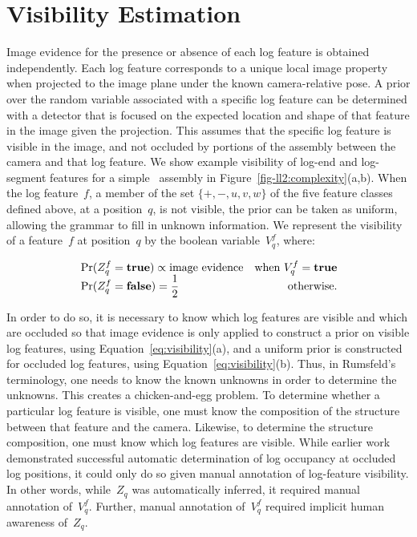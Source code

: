 \par\vspace{-1ex}
\section{Visibility Estimation}
\label{sec-ll2:visibility}

Image evidence for the presence or absence of each log feature is obtained
independently.
%
Each log feature corresponds to a unique local image property when projected to
the image plane under the known camera-relative pose.
%
A prior over the random variable associated with a specific log feature can be
determined with a detector that is focused on the expected location and shape
of that feature in the image given the projection.
%
This assumes that the specific log feature is visible in the image, and not
occluded by portions of the assembly between the camera and that log feature.
%
We show example visibility of log-end and log-segment features for a simple
\LincolnLog\ assembly in Figure~\ref{fig-ll2:complexity}(a,b).
%
When the log feature~$f$, a member of the set $\{+,-,u,v,w\}$ of the five
feature classes defined above, at a position~$q$, is not visible, the prior can
be taken as uniform, allowing the grammar to fill in unknown information.
%
We represent the visibility of a feature~$f$ at position~$q$ by the boolean
variable~$V^f_q$, where:

\par\vspace*{-4ex}
\begin{subequations}
  \begin{align}
    &\Pr(Z^f_q=\true)\propto\text{image evidence}&\text{when $V^f_q=\true$}\\[-1ex]
    &\Pr(Z^f_q=\false)=\frac{1}{2}&\text{otherwise.}
  \end{align}
  \label{eq:visibility}
  \vspace*{-2ex}
\end{subequations}

\par\vspace*{-1ex}\noindent
In order to do so, it is necessary to know which log features are visible and
which are occluded so that image evidence is only applied to construct a prior
on visible log features, using Equation~\ref{eq:visibility}(a), and a uniform
prior is constructed for occluded log features, using
Equation~\ref{eq:visibility}(b).
%
Thus, in Rumsfeld's terminology, one needs to know the known unknowns in order
to determine the unknowns.
%
This creates a chicken-and-egg problem.
%
To determine whether a particular log feature is visible, one must know the
composition of the structure between that feature and the camera.
%
Likewise, to determine the structure composition, one must know which log
features are visible.
%
While earlier work \cite{Siddharth2011} demonstrated successful automatic
determination of log occupancy at occluded log positions, it could only do so
given manual annotation of log-feature visibility.
%
In other words, while~$Z_q$ was automatically inferred, it required manual
annotation of~$V^f_q$.
%
Further, manual annotation of~$V^f_q$ required implicit human awareness
of~$Z_q$.

